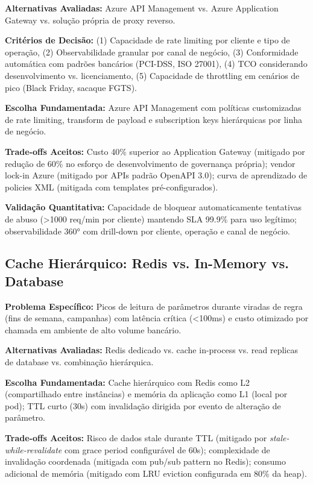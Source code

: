 \textbf{Alternativas Avaliadas:} Azure API Management vs. Azure Application Gateway vs. solução própria de proxy reverso.

\textbf{Critérios de Decisão:} (1) Capacidade de rate limiting por cliente e tipo de operação, (2) Observabilidade granular por canal de negócio, (3) Conformidade automática com padrões bancários (PCI-DSS, ISO 27001), (4) TCO considerando desenvolvimento vs. licenciamento, (5) Capacidade de throttling em cenários de pico (Black Friday, sacaque FGTS).

\textbf{Escolha Fundamentada:} Azure API Management com políticas customizadas de rate limiting, transform de payload e subscription keys hierárquicas por linha de negócio.

\textbf{Trade-offs Aceitos:} Custo 40\% superior ao Application Gateway (mitigado por redução de 60\% no esforço de desenvolvimento de governança própria); vendor lock-in Azure (mitigado por APIs padrão OpenAPI 3.0); curva de aprendizado de policies XML (mitigada com templates pré-configurados).

\textbf{Validação Quantitativa:} Capacidade de bloquear automaticamente tentativas de abuso (>1000 req/min por cliente) mantendo SLA 99.9\% para uso legítimo; observabilidade 360° com drill-down por cliente, operação e canal de negócio.

\subsection{Cache Hierárquico: Redis vs. In-Memory vs. Database}

\textbf{Problema Específico:} Picos de leitura de parâmetros durante viradas de regra (fins de semana, campanhas) com latência crítica (<100ms) e custo otimizado por chamada em ambiente de alto volume bancário.

\textbf{Alternativas Avaliadas:} Redis dedicado vs. cache in-process vs. read replicas de database vs. combinação hierárquica.

\textbf{Escolha Fundamentada:} Cache hierárquico com Redis como L2 (compartilhado entre instâncias) e memória da aplicação como L1 (local por pod); TTL curto (30s) com invalidação dirigida por evento de alteração de parâmetro.

\textbf{Trade-offs Aceitos:} Risco de dados stale durante TTL (mitigado por \textit{stale-while-revalidate} com grace period configurável de 60s); complexidade de invalidação coordenada (mitigada com pub/sub pattern no Redis); consumo adicional de memória (mitigado com LRU eviction configurada em 80\% da heap).

